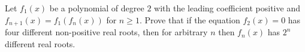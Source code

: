 Let $f_1(x)$ be a polynomial of degree $2$ with the leading coefficient positive and $f_{n+1}(x) =f_1(f_n(x))$ for $n\ge 1.$ Prove that if the equation $f_2(x)=0$ has four different non-positive real roots, then for arbitrary $n$ then $f_n(x)$ has $2^n$ different real roots.